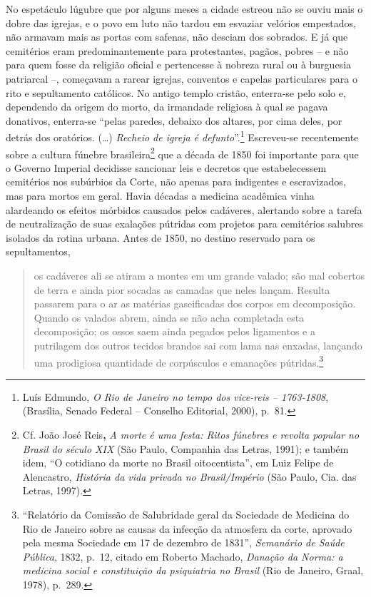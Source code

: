 No espetáculo lúgubre que por alguns meses a cidade estreou não se ouviu
mais o dobre das igrejas, e o povo em luto não tardou em esvaziar
velórios empestados, não armavam mais as portas com safenas, não desciam
dos sobrados. E já que cemitérios eram predominantemente para
protestantes, pagãos, pobres -- e não para quem fosse da religião
oficial e pertencesse à nobreza rural ou à burguesia patriarcal --,
começavam a rarear igrejas, conventos e capelas particulares para o rito
e sepultamento católicos. No antigo templo cristão, enterra-se pelo solo
e, dependendo da origem do morto, da irmandade religiosa à qual se
pagava donativos, enterra-se ``pelas paredes, debaixo dos altares, por
cima deles, por detrás dos oratórios. (\ldots{}) \emph{Recheio de igreja
é defunto}''.\footnote{Luís Edmundo, \emph{O Rio de Janeiro no tempo dos
  vice-reis -- 1763-1808}, (Brasília, Senado Federal -- Conselho
  Editorial, 2000), p.~81.} Escreveu-se recentemente sobre a cultura
fúnebre brasileira\footnote{Cf. João José Reis\textbf{,} \emph{A morte é
  uma festa: Ritos fúnebres e revolta popular no Brasil do século XIX}
  (São Paulo, Companhia das Letras, 1991); e também idem, ``O cotidiano
  da morte no Brasil oitocentista'', em Luiz Felipe de Alencastro,
  \emph{História da vida privada no Brasil/Império} (São Paulo, Cia. das
  Letras, 1997).} que a década de 1850 foi importante para que o Governo
Imperial decidisse sancionar leis e decretos que estabelecessem
cemitérios nos subúrbios da Corte, não apenas para indigentes e
escravizados, mas para mortos em geral. Havia décadas a medicina
acadêmica vinha alardeando os efeitos mórbidos causados pelos cadáveres,
alertando sobre a tarefa de neutralização de suas exalações pútridas com
projetos para cemitérios salubres isolados da rotina urbana. Antes de
1850, no destino reservado para os sepultamentos,

\begin{quote}
os cadáveres ali se atiram a montes em um grande valado; são mal
cobertos de terra e ainda pior socadas as camadas que neles lançam.
Resulta passarem para o ar as matérias gaseificadas dos corpos em
decomposição. Quando os valados abrem, ainda se não acha completada esta
decomposição; os ossos saem ainda pegados pelos ligamentos e a
putrilagem dos outros tecidos brandos sai com lama nas enxadas, lançando
uma prodigiosa quantidade de corpúsculos e emanações pútridas.\footnote{``Relatório
  da Comissão de Salubridade geral da Sociedade de Medicina do Rio de
  Janeiro sobre as causas da infecção da atmosfera da corte, aprovado
  pela mesma Sociedade em 17 de dezembro de 1831'', \emph{Semanário de
  Saúde Pública}, 1832, p.~12, citado em Roberto Machado, \emph{Danação
  da Norma: a medicina social e constituição da psiquiatria no Brasil}
  (Rio de Janeiro, Graal, 1978), p.~289.}
\end{quote}

